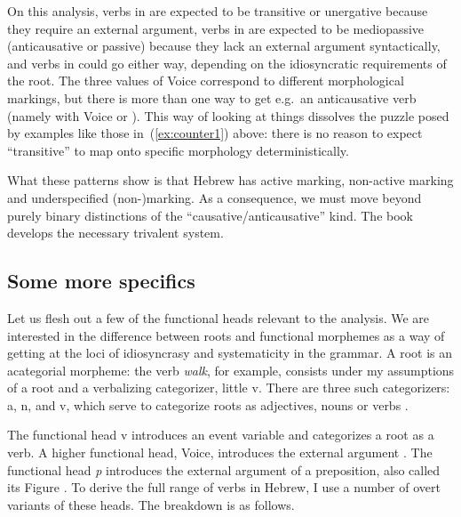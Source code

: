 On this analysis, verbs in {\thif} are expected to be transitive or unergative because they require an external argument, verbs in {\tnif} are expected to be mediopassive (anticausative or passive) because they lack an external argument syntactically, and verbs in {\tkal} could go either way, depending on the idiosyncratic requirements of the root. The three values of Voice correspond to different morphological markings, but there is more than one way to get e.g.~an anticausative verb (namely with Voice or {\vz}). This way of looking at things dissolves the puzzle posed by examples like those in~(\ref{ex:counter1}) above: there is no reason to expect ``transitive'' to map onto specific morphology deterministically.




What these patterns show is that Hebrew has active marking, non-active marking and underspecified (non-)marking. As a consequence, we must move beyond purely binary distinctions of the ``causative/anticausative'' kind. The book develops the necessary trivalent system.








	\subsection{Some more specifics}
Let us flesh out a few of the functional heads relevant to the analysis. We are interested in the difference between roots and functional morphemes as a way of getting at the loci of idiosyncrasy and systematicity in the grammar. A root is an acategorial morpheme: the verb \emph{walk}, for example, consists under my assumptions of a root  and a verbalizing categorizer, little v. There are three such categorizers: a, n, and v, which serve to categorize roots as adjectives, nouns or verbs \citep{marantz01,arad05,woodmarantz15}.

The functional head v introduces an event variable and categorizes a root as a verb. A higher functional head, Voice, introduces the external argument \citep{kratzer96,pylkkanen08,marantz13lingua}. The functional head \emph{p} introduces the external argument of a preposition, also called its Figure \citep{svenonius03,svenonius07,wood14nllt}. To derive the full range of verbs in Hebrew, I use a number of overt variants of these heads. The breakdown is as follows.

